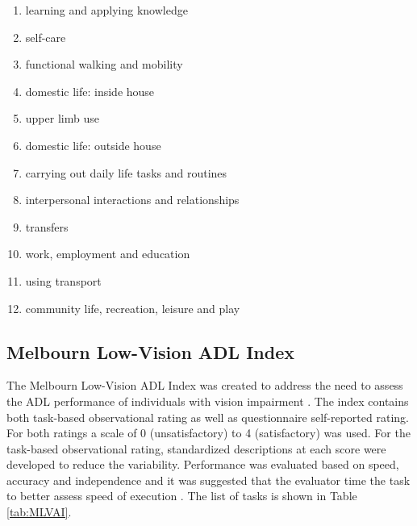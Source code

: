 \begin{enumerate}
    \item learning and applying knowledge
    \item self-care
    \item functional walking and mobility
    \item domestic life: inside house
    \item upper limb use
    \item domestic life: outside house
    \item carrying out daily life tasks and routines
    \item interpersonal interactions and relationships
    \item transfers
    \item work, employment and education
    \item using transport
    \item community life, recreation, leisure and play
\end{enumerate}

\clearpage
\subsection{Melbourn Low-Vision ADL Index}
The Melbourn Low-Vision ADL Index was created to address the need to assess the ADL performance of individuals with vision impairment \cite{haymes_development_2001}. The index contains both task-based observational rating as well as questionnaire self-reported rating. For both ratings a scale of 0 (unsatisfactory) to 4 (satisfactory) was used. For the task-based observational rating, standardized descriptions at each score were developed to reduce the variability. Performance was evaluated based on speed, accuracy and independence and it was suggested that the evaluator time the task to better assess speed of execution \cite{haymes_development_2001}. The list of tasks is shown in Table \ref{tab:MLVAI}.

